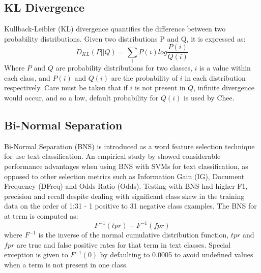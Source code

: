 \documentclass[twoside,11pt]{article}
\begin{document}
\subsection{KL Divergence}
Kullback-Leibler (KL) divergence quantifies the difference between two probability distributions. Given two distributions P and Q, it is expressed as:
\[
  D_{KL}(P||Q) = \sum_{i}P(i)log\frac{P(i)}{Q(i)}
\]
Where $P$ and $Q$ are probability distributions for two classes, $i$ is a value within each class, and $P(i)$ and $Q(i)$ are the probability of $i$ in each distribution respectively. Care must be taken that if $i$ is not present in $Q$, infinite divergence would occur, and so a low, default probability for $Q(i)$ is used by Chee.

\subsection{Bi-Normal Separation}
Bi-Normal Separation (BNS) is introduced as a word feature selection technique for use text classification. An empirical study by \citep{Forman} showed considerable performance advantages when using BNS with SVMs for text classification, as opposed to other selection metrics such as Information Gain (IG), Document Frequency (DFreq) and Odds Ratio (Odds). Testing with BNS had higher F1, precision and recall despite dealing with significant class skew in the training data on the order of 1:31 - 1 positive to 31 negative class examples. The BNS for at term is computed as:
\[
  F^{-1}(tpr) - F^{-1}(fpr)
\]
where $F^{-1}$ is the inverse of the normal cumulative distribution function, $tpr$ and $fpr$ are true and false positive rates for that term in text classes. Special exception is given to $F^{-1}(0)$ by defaulting to 0.0005 to avoid undefined values when a term is not present in one class.
\end{document}
